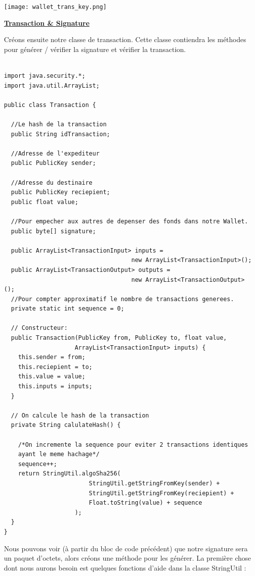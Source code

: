 \documentclass[12pt]{report}
\begin{document}
\texttt{[image: wallet\_trans\_key.png]}   
\begin{center}
   \textbf{\underline{Transaction \& Signature}} \\[1cm]
\end{center}

Créons ensuite notre classe de transaction. Cette classe contiendra les méthodes pour générer / vérifier la signature et vérifier la transaction.

\begin{lstlisting}

import java.security.*;
import java.util.ArrayList;

public class Transaction {

  //Le hash de la transaction	
  public String idTransaction; 
  
  //Adresse de l'expediteur
  public PublicKey sender; 
  
  //Adresse du destinaire
  public PublicKey reciepient; 
  public float value;
  
  //Pour empecher aux autres de depenser des fonds dans notre Wallet.
  public byte[] signature; 
	
  public ArrayList<TransactionInput> inputs = 
                                    new ArrayList<TransactionInput>();
  public ArrayList<TransactionOutput> outputs = 
                                    new ArrayList<TransactionOutput>();
  //Pour compter approximatif le nombre de transactions generees.
  private static int sequence = 0;
	
  // Constructeur: 
  public Transaction(PublicKey from, PublicKey to, float value, 
                    ArrayList<TransactionInput> inputs) {
    this.sender = from;
    this.reciepient = to;
    this.value = value;
    this.inputs = inputs;
  }
    
  // On calcule le hash de la transaction
  private String calulateHash() {
  
    /*On incremente la sequence pour eviter 2 transactions identiques 
    ayant le meme hachage*/
    sequence++;
    return StringUtil.algoSha256(
                        StringUtil.getStringFromKey(sender) +
                        StringUtil.getStringFromKey(reciepient) +
                        Float.toString(value) + sequence
                    );
  }
}

\end{lstlisting}

Nous pouvons voir (à partir du bloc de code précédent) que notre signature sera un paquet d’octets, alors créons une méthode pour les générer. La première chose dont nous aurons besoin est quelques fonctions d'aide dans la classe StringUtil  :
\end{document}
